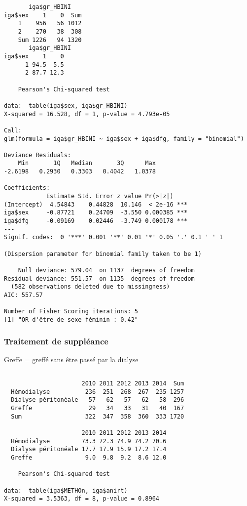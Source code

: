 \documentclass[11pt,a4paper]{article}\usepackage[]{graphicx}\usepackage[]{color}
\makeatletter
\newenvironment{kframe}{%
 \def\at@end@of@kframe{}%
 \ifinner\ifhmode%
  \def\at@end@of@kframe{\end{minipage}}%
  \begin{minipage}{\columnwidth}%
 \fi\fi%
 \def\FrameCommand##1{\hskip\@totalleftmargin \hskip-\fboxsep
 \colorbox{shadecolor}{##1}\hskip-\fboxsep
     \hskip-\linewidth \hskip-\@totalleftmargin \hskip\columnwidth}%
 \MakeFramed {\advance\hsize-\width
   \@totalleftmargin\z@ \linewidth\hsize
   \@setminipage}}%
 {\par\unskip\endMakeFramed%
 \at@end@of@kframe}
\newenvironment{knitrout}{}{} %
\makeatother
\begin{document}
\begin{knitrout}
\color{fgcolor}\begin{kframe}
\begin{verbatim}
       iga$gr_HBINI
iga$sex    1    0  Sum
    1    956   56 1012
    2    270   38  308
    Sum 1226   94 1320
       iga$gr_HBINI
iga$sex    1    0
      1 94.5  5.5
      2 87.7 12.3

	Pearson's Chi-squared test

data:  table(iga$sex, iga$gr_HBINI)
X-squared = 16.528, df = 1, p-value = 4.793e-05

Call:
glm(formula = iga$gr_HBINI ~ iga$sex + iga$dfg, family = "binomial")

Deviance Residuals: 
    Min       1Q   Median       3Q      Max  
-2.6198   0.2930   0.3303   0.4042   1.0378  

Coefficients:
            Estimate Std. Error z value Pr(>|z|)    
(Intercept)  4.54843    0.44828  10.146  < 2e-16 ***
iga$sex     -0.87721    0.24709  -3.550 0.000385 ***
iga$dfg     -0.09169    0.02446  -3.749 0.000178 ***
---
Signif. codes:  0 '***' 0.001 '**' 0.01 '*' 0.05 '.' 0.1 ' ' 1

(Dispersion parameter for binomial family taken to be 1)

    Null deviance: 579.04  on 1137  degrees of freedom
Residual deviance: 551.57  on 1135  degrees of freedom
  (582 observations deleted due to missingness)
AIC: 557.57

Number of Fisher Scoring iterations: 5
[1] "OR d'être de sexe féminin : 0.42"
\end{verbatim}
\end{kframe}
\end{knitrout}


    \subsubsection{Traitement de suppléance}
    
Greffe = greffé sans être passé par la dialyse

\begin{knitrout}
\color{fgcolor}\begin{kframe}
\begin{verbatim}
                     
                      2010 2011 2012 2013 2014  Sum
  Hémodialyse          236  251  268  267  235 1257
  Dialyse péritonéale   57   62   57   62   58  296
  Greffe                29   34   33   31   40  167
  Sum                  322  347  358  360  333 1720
                     
                      2010 2011 2012 2013 2014
  Hémodialyse         73.3 72.3 74.9 74.2 70.6
  Dialyse péritonéale 17.7 17.9 15.9 17.2 17.4
  Greffe               9.0  9.8  9.2  8.6 12.0

	Pearson's Chi-squared test

data:  table(iga$METHOn, iga$anirt)
X-squared = 3.5363, df = 8, p-value = 0.8964
\end{verbatim}
\end{kframe}
\end{knitrout}
\end{document}
